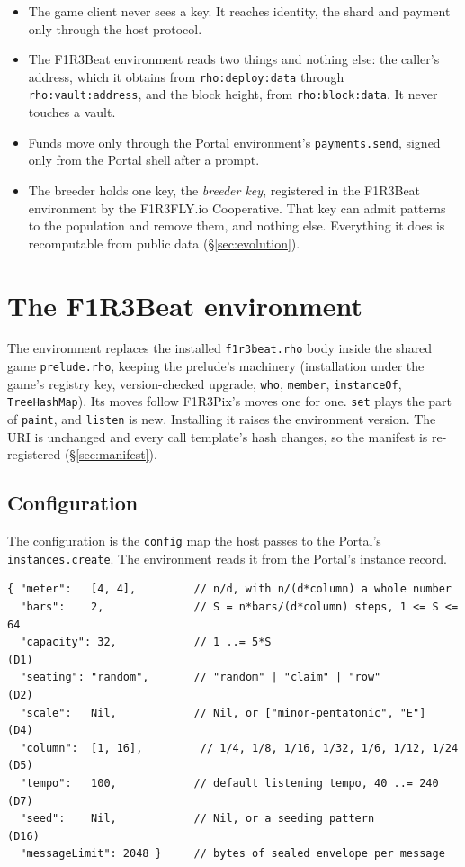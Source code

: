 \documentclass[11pt,a4paper]{article}
\newcommand{\code}[1]{\texttt{#1}}
\begin{document}
\begin{itemize}[leftmargin=1.2em,itemsep=2pt]
\item The game client never sees a key. It reaches identity, the shard and payment only
  through the host protocol.
\item The F1R3Beat environment reads two things and nothing else: the caller's address,
  which it obtains from \code{rho:deploy:data} through \code{rho:vault:address}, and the block
  height, from \code{rho:block:data}. It never touches a vault.
\item Funds move only through the Portal environment's \code{payments.send}, signed only from
  the Portal shell after a prompt.
\item The breeder holds one key, the \emph{breeder key}, registered in the F1R3Beat environment
  by the F1R3FLY.io Cooperative. That key can admit patterns to the population and remove them,
  and nothing else. Everything it does is recomputable from public data (\S\ref{sec:evolution}).
\end{itemize}

\section{The F1R3Beat environment}\label{sec:env}

The environment replaces the installed \code{f1r3beat.rho} body inside the shared game
\code{prelude.rho}, keeping the prelude's machinery (installation under the game's registry
key, version-checked upgrade, \code{who}, \code{member}, \code{instanceOf}, \code{TreeHashMap}).
Its moves follow F1R3Pix's moves one for one. \code{set} plays the part of \code{paint}, and
\code{listen} is new. Installing it raises the environment version. The URI is unchanged and
every call template's hash changes, so the manifest is re-registered (\S\ref{sec:manifest}).

\subsection{Configuration}

The configuration is the \code{config} map the host passes to the Portal's
\code{instances.create}. The environment reads it from the Portal's instance record.

\begin{lstlisting}[language=rholang]
{ "meter":   [4, 4],         // n/d, with n/(d*column) a whole number
  "bars":    2,              // S = n*bars/(d*column) steps, 1 <= S <= 64
  "capacity": 32,            // 1 ..= 5*S                                      (D1)
  "seating": "random",       // "random" | "claim" | "row"                     (D2)
  "scale":   Nil,            // Nil, or ["minor-pentatonic", "E"]              (D4)
  "column":  [1, 16],         // 1/4, 1/8, 1/16, 1/32, 1/6, 1/12, 1/24          (D5)
  "tempo":   100,            // default listening tempo, 40 ..= 240            (D7)
  "seed":    Nil,            // Nil, or a seeding pattern                       (D16)
  "messageLimit": 2048 }     // bytes of sealed envelope per message
\end{lstlisting}
\end{document}
